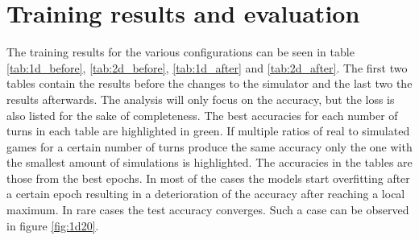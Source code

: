 \newpage
   
\section{Training results and evaluation}
\label{training_results_and_evaluation}
The training results for the various configurations can be seen in table \ref{tab:1d_before}, \ref{tab:2d_before}, \ref{tab:1d_after} and \ref{tab:2d_after}. The first two tables contain the results before the changes to the simulator and the last two the results afterwards. The analysis will only focus on the accuracy, but the loss is also listed for the sake of completeness. The best accuracies for each number of turns in each table are highlighted in green. If multiple ratios of real to simulated games for a certain number of turns produce the same accuracy only the one with the smallest amount of simulations is highlighted. The accuracies in the tables are those from the best epochs. In most of the cases the models start overfitting after a certain epoch resulting in a deterioration of the accuracy after reaching a local maximum. In rare cases the test accuracy converges. Such a case can be observed in figure \ref{fig:1d20}.

